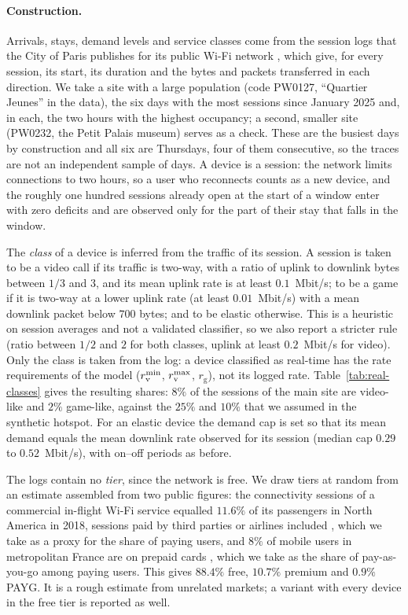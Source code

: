 \paragraph{Construction.}
Arrivals, stays, demand levels and service classes come from the session logs that the City of Paris publishes for its public Wi-Fi network \citep{pariswifi2026}, which give, for every session, its start, its duration and the bytes and packets transferred in each direction.
We take a site with a large population (code PW0127, ``Quartier Jeunes'' in the data), the six days with the most sessions since January 2025 and, in each, the two hours with the highest occupancy; a second, smaller site (PW0232, the Petit Palais museum) serves as a check.
These are the busiest days by construction and all six are Thursdays, four of them consecutive, so the traces are not an independent sample of days.
A device is a session: the network limits connections to two hours, so a user who reconnects counts as a new device, and the roughly one hundred sessions already open at the start of a window enter with zero deficits and are observed only for the part of their stay that falls in the window.

The \emph{class} of a device is inferred from the traffic of its session.
A session is taken to be a video call if its traffic is two-way, with a ratio of uplink to downlink bytes between $1/3$ and $3$, and its mean uplink rate is at least $0.1$~Mbit/s; to be a game if it is two-way at a lower uplink rate (at least $0.01$~Mbit/s) with a mean downlink packet below $700$ bytes; and to be elastic otherwise.
This is a heuristic on session averages and not a validated classifier, so we also report a stricter rule (ratio between $1/2$ and $2$ for both classes, uplink at least $0.2$~Mbit/s for video).
Only the class is taken from the log: a device classified as real-time has the rate requirements of the model ($r^{\min}_{\mathrm{v}}$, $r^{\max}_{\mathrm{v}}$, $r_{\mathrm{g}}$), not its logged rate.
Table~\ref{tab:real-classes} gives the resulting shares: $8\%$ of the sessions of the main site are video-like and $2\%$ game-like, against the $25\%$ and $10\%$ that we assumed in the synthetic hotspot.
For an elastic device the demand cap is set so that its mean demand equals the mean downlink rate observed for its session (median cap $0.29$ to $0.52$~Mbit/s), with on--off periods as before.

The logs contain no \emph{tier}, since the network is free.
We draw tiers at random from an estimate assembled from two public figures: the connectivity sessions of a commercial in-flight Wi-Fi service equalled $11.6\%$ of its passengers in North America in 2018, sessions paid by third parties or airlines included \citep{gogo2019tenk}, which we take as a proxy for the share of paying users, and $8\%$ of mobile users in metropolitan France are on prepaid cards \citep{arcep2026mobile}, which we take as the share of pay-as-you-go among paying users.
This gives $88.4\%$ free, $10.7\%$ premium and $0.9\%$ PAYG. It is a rough estimate from unrelated markets; a variant with every device in the free tier is reported as well.

